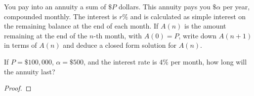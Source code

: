 \begin{problem}{1}
  You pay into an annuity a sum of $\$P$ dollars. This annuity
  pays you $\$\alpha$ per year, compounded monthly. The interest is $r\%$ and is calculated
  as simple interest on the remaining balance at the end of each month. If $A(n)$
  is the amount remaining at the end of the $n$-th month, with $A(0) = P$,
  write down $A(n+1)$ in terms of $A(n)$ and deduce a closed form solution
  for $A(n)$.

  If $P = \$100,000$, $\alpha = \$500$, and the interest rate is $4\%$ per month,
  how long will the annuity last?
\end{problem}

\begin{proof}
\end{proof}
\newpage
